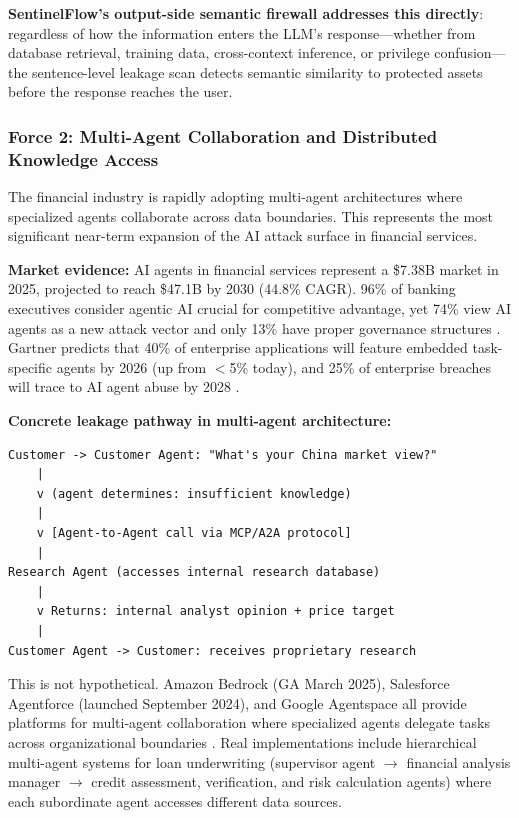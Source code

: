 \documentclass[12pt,a4paper]{article}
\begin{document}
\textbf{SentinelFlow's output-side semantic firewall addresses this directly}: regardless of how the information enters the LLM's response---whether from database retrieval, training data, cross-context inference, or privilege confusion---the sentence-level leakage scan detects semantic similarity to protected assets before the response reaches the user.

\subsubsection{Force 2: Multi-Agent Collaboration and Distributed Knowledge Access}
\label{sec:multi_agent_threat}

The financial industry is rapidly adopting multi-agent architectures where specialized agents collaborate across data boundaries. This represents the most significant near-term expansion of the AI attack surface in financial services.

\textbf{Market evidence:} AI agents in financial services represent a \$7.38B market in 2025, projected to reach \$47.1B by 2030 (44.8\% CAGR). 96\% of banking executives consider agentic AI crucial for competitive advantage, yet 74\% view AI agents as a new attack vector and only 13\% have proper governance structures \cite{nightfall_securing_agents}. Gartner predicts that 40\% of enterprise applications will feature embedded task-specific agents by 2026 (up from $<$5\% today), and 25\% of enterprise breaches will trace to AI agent abuse by 2028 \cite{flobotics_agentic_2025}.

\textbf{Concrete leakage pathway in multi-agent architecture:}

\begin{lstlisting}[caption={Multi-Agent Cross-Boundary Leakage Pathway}, basicstyle=\ttfamily\footnotesize]
Customer -> Customer Agent: "What's your China market view?"
    |
    v (agent determines: insufficient knowledge)
    |
    v [Agent-to-Agent call via MCP/A2A protocol]
    |
Research Agent (accesses internal research database)
    |
    v Returns: internal analyst opinion + price target
    |
Customer Agent -> Customer: receives proprietary research
\end{lstlisting}

This is not hypothetical. Amazon Bedrock (GA March 2025), Salesforce Agentforce (launched September 2024), and Google Agentspace all provide platforms for multi-agent collaboration where specialized agents delegate tasks across organizational boundaries \cite{flobotics_agentic_2025, ms_financial_ai_2026}. Real implementations include hierarchical multi-agent systems for loan underwriting (supervisor agent $\rightarrow$ financial analysis manager $\rightarrow$ credit assessment, verification, and risk calculation agents) where each subordinate agent accesses different data sources.
\end{document}
